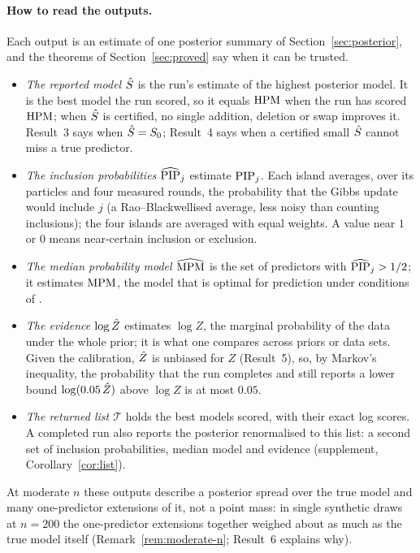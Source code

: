 \paragraph{How to read the outputs.} Each output is an estimate of one posterior summary of
Section~\ref{sec:posterior}, and the theorems of Section~\ref{sec:proved} say when it can be trusted.
\begin{itemize}[leftmargin=1.5em,itemsep=1pt]
  \item \emph{The reported model $\hat S$} is the run's estimate of the highest posterior model. It is the best model the
    run scored, so it equals $\mathrm{HPM}$ when the run has scored $\mathrm{HPM}$; when $\hat S$ is certified, no single addition,
    deletion or swap improves it. Result~3 says when $\hat S=S_0$; Result~4 says when a certified small $\hat S$ cannot miss
    a true predictor.
  \item \emph{The inclusion probabilities $\widehat{\mathrm{PIP}}_j$} estimate $\mathrm{PIP}_j$. Each island averages, over its particles and
    four measured rounds, the probability that the Gibbs update would include $j$ (a Rao--Blackwellised average, less
    noisy than counting inclusions); the four islands are averaged with equal weights. A value near $1$ or $0$ means near-certain
    inclusion or exclusion.
  \item \emph{The median probability model $\widehat{\mathrm{MPM}}$} is the set of predictors with $\widehat{\mathrm{PIP}}_j>1/2$; it estimates $\mathrm{MPM}$,
    the model that is optimal for prediction under conditions of \citet{BarbieriBerger2004}.
  \item \emph{The evidence $\log\hat Z$} estimates $\log Z$, the marginal probability of the data under the whole prior;
    it is what one compares across priors or data sets. Given the calibration, $\hat Z$ is unbiased for $Z$
    (Result~5), so, by Markov's inequality, the probability that the run completes and still reports a lower bound
    $\log(0.05\,\hat Z)$ above $\log Z$ is at most $0.05$.
  \item \emph{The returned list $\mathcal T$} holds the best models scored, with their exact log scores. A completed run
    also reports the posterior renormalised to this list: a second set of inclusion probabilities, median model and
    evidence (supplement, Corollary~\ref{cor:list}).
\end{itemize}
At moderate $n$ these outputs describe a posterior spread over the true model and many one-predictor extensions of it,
not a point mass: in single synthetic draws at $n=200$ the one-predictor extensions together weighed about as much as the
true model itself (Remark~\ref{rem:moderate-n}; Result~6 explains why).

